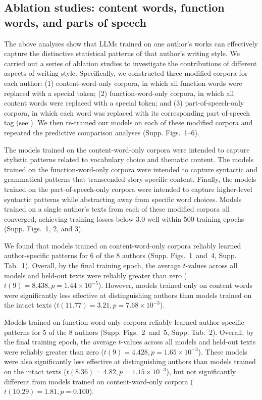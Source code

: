 \documentclass[11pt]{article}
\newcommand{\crossentropyContent}{{1}}
\newcommand{\crossentropyFunction}{{2}}
\newcommand{\crossentropyPOS}{{3}}
\newcommand{\ttestsContent}{{4}}
\newcommand{\ttestsFunction}{{5}}
\newcommand{\ttestsPOS}{{6}}
\newcommand{\authortableContent}{{1}}
\newcommand{\authortableFunction}{{2}}
\begin{document}
\subsection{Ablation studies: content words, function words, and parts of speech}

The above analyses show that LLMs trained on one author's works can effectively
capture the distinctive statistical patterns of that author's writing style. We
carried out a series of ablation studies to investigate the contributions of
different aspects of writing style. Specifically, we constructed three modified
corpora for each author: (1) content-word-only corpora, in which all function
words were replaced with a special token; (2) function-word-only corpora, in
which all content words were replaced with a special token; and (3)
part-of-speech-only corpora, in which each word was replaced with its
corresponding part-of-speech tag (see ). We then
re-trained our models on each of these modified corpora and repeated the
predictive comparison analyses (Supp. Figs.~\crossentropyContent--\ttestsPOS).

The models trained on the content-word-only corpora were intended to capture
stylistic patterns related to vocabulary choice and thematic content. The
models trained on the function-word-only corpora were intended to capture
syntactic and grammatical patterns that transcended story-specific content.
Finally, the models trained on the part-of-speech-only corpora were intended to
capture higher-level syntactic patterns while abstracting away from specific
word choices. Models trained on a single author's texts from each of these
modified corpora all converged, achieving training losses below 3.0 well within
500 training epochs (Supp. Figs.~\crossentropyContent, \crossentropyFunction,
and \crossentropyPOS).

We found that models trained on content-word-only corpora reliably learned
author-specific patterns for 6 of the 8 authors (Supp.
Figs.~\crossentropyContent~and~\ttestsContent, Supp.
Tab.~\authortableContent). Overall, by the final training epoch, the average
$t$-values across all models and held-out texts were reliably greater than zero
($t(9) = 8.438, p = 1.44 \times 10^{-5}$). However, models trained only on
content words were significantly less effective at distinguishing authors than
models trained on the intact texts ($t(11.77) = 3.21, p = 7.68 \times
10^{-3}$).

Models trained on function-word-only corpora reliably learned author-specific
patterns for 5 of the 8 authors (Supp.
Figs.~\crossentropyFunction~and~\ttestsFunction, Supp.
Tab.~\authortableFunction). Overall, by the final training epoch, the average
$t$-values across all models and held-out texts were reliably greater than zero
($t(9) = 4.428, p = 1.65 \times 10^{-3}$). These models were also significantly
less effective at distinguishing authors than models trained on the intact
texts ($t(8.36) = 4.82, p = 1.15 \times 10^{-3}$), but not significantly
different from models trained on content-word-only corpora ($t(10.29) = 1.81, p
= 0.100$).
\end{document}
